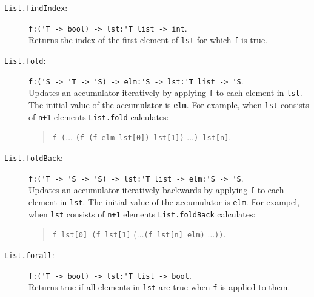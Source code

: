 \documentclass[fsharpNotes.tex]{subfiles}
\begin{document}
\begin{description}
\item[\texttt{List.findIndex}:] \lstinline{f:('T -> bool) -> lst:'T list -> int}.~\\
  Returns the index of the first element of \lstinline{lst} for which \lstinline{f} is true.
\item[\texttt{List.fold}:] \lstinline{f:('S -> 'T -> 'S) -> elm:'S -> lst:'T list -> 'S}.~\\
  Updates an accumulator iteratively by applying \lstinline{f} to each element in \lstinline{lst}. The initial value of the accumulator is \lstinline{elm}. For example, when \lstinline{lst} consists of \lstinline{n+1} elements
  \lstinline{List.fold} calculates:
  \begin{quote}
    \lstinline{f (}$\ldots$ \lstinline{(f (f elm lst[0]) lst[1])} $\ldots$\lstinline{) lst[n]}.
  \end{quote}
\item[\texttt{List.foldBack}:] \lstinline{f:('T -> 'S -> 'S) -> lst:'T list -> elm:'S -> 'S}.~\\
  Updates an accumulator iteratively backwards by applying \lstinline{f} to each element in \lstinline{lst}. The initial value of the accumulator is \lstinline{elm}. For exampel, when \lstinline{lst} consists of \lstinline{n+1} elements
  \lstinline{List.foldBack} calculates:
  \begin{quote}
    \lstinline{f lst[0] (f lst[1]} ($\ldots$\lstinline{(f lst[n] elm)} $\ldots$\lstinline{))}.
  \end{quote}
\item[\texttt{List.forall}:] \lstinline{f:('T -> bool) -> lst:'T list -> bool}.~\\
  Returns true if all elements in \lstinline{lst} are true when \lstinline{f} is applied to them.

\end{description}
\end{document}

